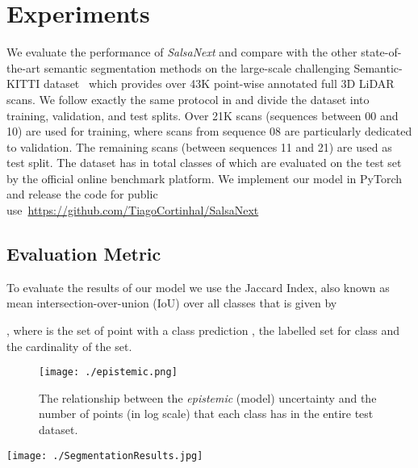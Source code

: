 \documentclass[letterpaper, 10 pt, conference]{ieeeconf}
\newcommand{\snx}[1]{\textit{SalsaNext }{#1}}
\newcommand{\sk}[1]{Semantic-KITTI {#1}}
\begin{document}
\section{Experiments}

We evaluate the performance of \snx and compare with the other state-of-the-art semantic segmentation methods on the large-scale challenging  \sk dataset~\cite{semantickitti} 
which provides over 43K point-wise annotated full 3D LiDAR scans. 
We follow exactly the same protocol in \cite{rangenetpp} and divide the dataset into training, validation, and test splits. Over 21K scans (sequences between 00 and 10) are used for training, where scans from sequence 08 are particularly dedicated to validation. The remaining scans (between sequences 11 and 21) are used as test split. The dataset has in total  classes  of which are evaluated on the test set by the official online benchmark platform.
We implement our model in PyTorch and release the code for public use~\href{https://github.com/TiagoCortinhal/SalsaNext}{https://github.com/TiagoCortinhal/SalsaNext}

\subsection{Evaluation Metric}
\label{metrics}
To evaluate the results of our model we use the Jaccard Index, also known as mean intersection-over-union (IoU) over all classes that is given by 

, where  is the set of point with a class prediction ,  the labelled set for class  and  the cardinality of the set. 



 
\begin{figure}[!b]
    \centering
    \texttt{[image: ./epistemic.png]}
    \caption{The relationship between the \textit{epistemic} (model) uncertainty and the number of points (in log scale) that each class has in the entire test dataset.  }
    \label{fig:epistuncert}
\end{figure}

\begin{figure*}[!b]
    \centering
    \texttt{[image: ./SegmentationResults.jpg]}
    \caption{Sample qualitative results showing successes of our proposed \snx method [best view in color]. At the bottom of each scene, the range-view image of the network response is shown. Note that the corresponding camera images on the   right are only for visualization purposes and have not been used in the training. The top camera image on the right shows the projected segments whereas the middle and bottom images depict the projected \textit{epistemic} and \textit{aleatoric}  uncertainties, respectively. Note that the lighter the color is, the more uncertain the network becomes.}
    \label{fig:segresults}
\end{figure*}
\end{document}

